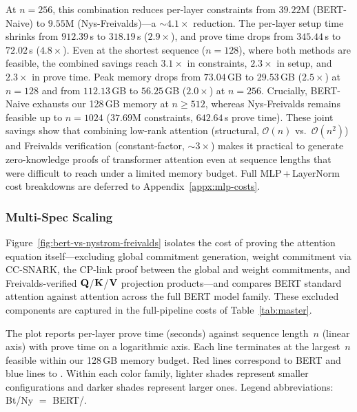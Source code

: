 \documentclass[sigconf,anonymous,review,balance=false]{acmart}
\newcommand{\rev}[1]{{\color{magenta}#1}}
\begin{document}
At $n{=}256$, this combination reduces per-layer constraints from $39.22$M (BERT-Naive) to $9.55$M (\rev{Nys-Freivalds})---a ${\sim}4.1{\times}$ reduction. The per-layer setup time shrinks from \rev{$912.39$}\,s to \rev{$318.19$}\,s ($2.9{\times}$), and prove time drops from \rev{$345.44$}\,s to \rev{$72.02$}\,s (\rev{$4.8{\times}$}). Even at the shortest sequence ($n{=}128$), where both methods are feasible, the combined savings reach $3.1{\times}$ in constraints, $2.3{\times}$ in setup, and $2.3{\times}$ in prove time. Peak memory drops from $73.04$\,GB to \rev{$29.53$}\,GB ($2.5{\times}$) at $n{=}128$ and from \rev{$112.13$}\,GB to \rev{$56.25$}\,GB (\rev{$2.0{\times}$}) at $n{=}256$. Crucially, BERT-Naive exhausts our 128\,GB memory at $n{\geq}512$, whereas \rev{Nys-Freivalds} remains feasible up to $n{=}1024$ ($37.69$M constraints, \rev{$642.64$}\,s prove time). These joint savings show that combining low-rank attention (structural, $\mathcal{O}(n)$ vs.\ $\mathcal{O}(n^2)$) and Freivalds verification (constant-factor, ${\sim}3{\times}$) makes it practical to generate zero-knowledge proofs of transformer attention even at sequence lengths that were difficult to reach under a limited memory budget. Full MLP\,+\,LayerNorm cost breakdowns are deferred to Appendix~\ref{appx:mlp-costs}.



\subsubsection{Multi-Spec Scaling}
\label{subsec:multi-spec}

Figure~\ref{fig:bert-vs-nystrom-freivalds} isolates the cost of proving the attention equation itself---excluding global commitment generation, weight commitment via \rev{CC-SNARK}, the \rev{CP-link} proof between the global and weight commitments, and Freivalds-verified \rev{${\mathbf{Q}}$/${\mathbf{K}}$/${\mathbf{V}}$ projection products}---and compares BERT standard attention against \nystrom attention across the full BERT model family. \rev{These excluded components are captured in the full-pipeline costs of Table~\ref{tab:master}.}

The plot reports per-layer prove time (seconds) against sequence length~$n$ (linear axis) with prove time on a logarithmic axis. Each line terminates at the largest~$n$ feasible within our 128\,GB memory budget. Red lines correspond to BERT and blue lines to \nystrom. Within each color family, lighter shades represent smaller configurations and darker shades represent larger ones. Legend abbreviations: Bt/Ny $=$ BERT/\nystrom.
\end{document}
